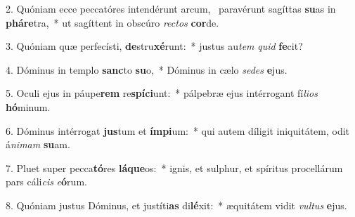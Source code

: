 2. Quóniam ecce peccatóres intendérunt arcum, \dag\  paravérunt sagíttas \textbf{su}as in \textbf{phá}\textbf{re}tra,~*  ut sagíttent in obscúro \textit{rec}\textit{tos} \textbf{cor}de.\

3. Quóniam quæ perfecísti, \textbf{de}stru\textbf{xé}runt:~*  justus au\textit{tem} \textit{quid} \textbf{fe}cit?\

4. Dóminus in templo \textbf{sanc}to \textbf{su}o,~*  Dóminus in cælo \textit{se}\textit{des} \textbf{e}jus.\

5. Oculi ejus in páupe\textbf{rem} re\textbf{spí}\textbf{ci}unt:~*  pálpebræ ejus intérrogant fí\textit{li}\textit{os} \textbf{hó}minum.\

6. Dóminus intérrogat \textbf{jus}tum et \textbf{ím}\textbf{pi}um:~*  qui autem díligit iniquitátem, odit á\textit{ni}\textit{mam} \textbf{su}am.\

7. Pluet super pecca\textbf{tó}res \textbf{lá}\textbf{que}os:~*  ignis, et sulphur, et spíritus procellárum pars cáli\textit{cis} \textit{e}\textbf{ó}rum.\

8. Quóniam justus Dóminus, et justíti\textbf{as} di\textbf{lé}xit:~*  æquitátem vidit \textit{vul}\textit{tus} \textbf{e}jus.\

